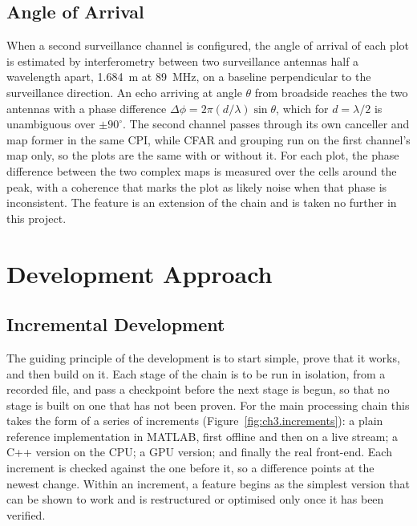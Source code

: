 \subsection{Angle of Arrival}
\label{subsec:ch3.stages.aoa}

When a second surveillance channel is configured, the angle of arrival of each plot is estimated by interferometry between two surveillance antennas half a wavelength apart, 1.684~m at 89~MHz, on a baseline perpendicular to the surveillance direction. An echo arriving at angle $\theta$ from broadside reaches the two antennas with a phase difference $\Delta\phi = 2\pi (d/\lambda) \sin\theta$, which for $d = \lambda/2$ is unambiguous over $\pm 90^\circ$. The second channel passes through its own canceller and map former in the same CPI, while CFAR and grouping run on the first channel's map only, so the plots are the same with or without it. For each plot, the phase difference between the two complex maps is measured over the cells around the peak, with a coherence that marks the plot as likely noise when that phase is inconsistent. The feature is an extension of the chain and is taken no further in this project.

\section{Development Approach}
\label{sec:ch3.philosophy}

\subsection{Incremental Development}
\label{subsec:ch3.philosophy.incremental}

The guiding principle of the development is to start simple, prove that it works, and then build on it. Each stage of the chain is to be run in isolation, from a recorded file, and pass a checkpoint before the next stage is begun, so that no stage is built on one that has not been proven. For the main processing chain this takes the form of a series of increments (Figure~\ref{fig:ch3.increments}): a plain reference implementation in MATLAB, first offline and then on a live stream; a C++ version on the CPU; a GPU version; and finally the real front-end. Each increment is checked against the one before it, so a difference points at the newest change. Within an increment, a feature begins as the simplest version that can be shown to work and is restructured or optimised only once it has been verified.

